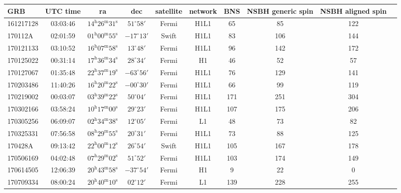 \documentclass[11pt]{cuthesis}
\begin{document}
\begin{landscape}
\begin{table}
\begin{tabular}{l c  c  c  c  c  c  c  c c |} 
\hline
 GRB & UTC time & ra & dec & satellite & network & BNS & NSBH generic spin & NSBH aligned spin \\
\hline
161217128 & 03:03:46  & $14^{\mathrm{h}}26^{\mathrm{m}}31^{\mathrm{s}}$ & $51^{\circ}58'$ &  Fermi   & H1L1   & 65  & 85  & 122 \\
170112A   & 02:01:59  & $01^{\mathrm{h}}00^{\mathrm{m}}55^{\mathrm{s}}$ & $-17^{\circ}13'$ & Swift   & H1L1   & 83  & 106 & 144 \\
170121133 & 03:10:52  & $16^{\mathrm{h}}07^{\mathrm{m}}58^{\mathrm{s}}$ & $13^{\circ}48'$ &  Fermi   & H1L1   & 96  & 142 & 172 \\
170125022 & 00:31:14  & $17^{\mathrm{h}}36^{\mathrm{m}}34^{\mathrm{s}}$ & $28^{\circ}34'$ &  Fermi   & H1     & 46  & 52  & 57 \\
170127067 & 01:35:48  & $22^{\mathrm{h}}37^{\mathrm{m}}19^{\mathrm{s}}$ & $-63^{\circ}56'$ & Fermi   & H1L1   & 76  & 129 & 141 \\
170203486 & 11:40:26  & $16^{\mathrm{h}}20^{\mathrm{m}}22^{\mathrm{s}}$ & $-00^{\circ}30'$ & Fermi   & H1L1   & 66  & 99  & 119 \\
170219002 & 00:03:07  & $03^{\mathrm{h}}39^{\mathrm{m}}22^{\mathrm{s}}$ & $50^{\circ}04'$ &  Fermi   & H1L1   & 171 & 251 & 304 \\
170302166 & 03:58:24  & $10^{\mathrm{h}}17^{\mathrm{m}}00^{\mathrm{s}}$ & $29^{\circ}23'$ &  Fermi   & H1L1   & 107 & 175 & 206 \\
170305256 & 06:09:07  & $02^{\mathrm{h}}34^{\mathrm{m}}38^{\mathrm{s}}$ & $12^{\circ}05'$ &  Fermi   & L1     & 48  & 73  & 82 \\
170325331 & 07:56:58  & $08^{\mathrm{h}}29^{\mathrm{m}}55^{\mathrm{s}}$ & $20^{\circ}31'$ &  Fermi   & H1L1   & 73  & 88  & 125 \\
170428A   & 09:13:42  & $22^{\mathrm{h}}00^{\mathrm{m}}12^{\mathrm{s}}$ & $26^{\circ}54'$ &  Swift   & H1L1   & 105 & 167 & 178 \\
170506169 & 04:02:48  & $07^{\mathrm{h}}29^{\mathrm{m}}02^{\mathrm{s}}$ & $51^{\circ}52'$ &  Fermi   & H1L1   & 103 & 174 & 149 \\
170614505 & 12:06:39  & $20^{\mathrm{h}}43^{\mathrm{m}}58^{\mathrm{s}}$ & $-37^{\circ}54'$ & Fermi   & H1     & 9   & 22  & 0 \\
170709334 & 08:00:24  & $20^{\mathrm{h}}40^{\mathrm{m}}10^{\mathrm{s}}$ & $02^{\circ}12'$ &  Fermi   & L1     & 139 & 228 & 255 \\

\end{tabular}
\end{table}
\end{landscape}
\end{document}
